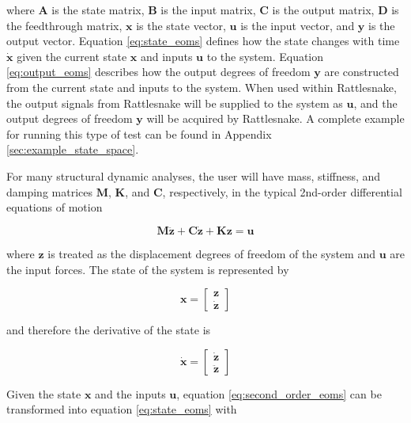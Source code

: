 \documentclass[pdf,12pt,report]{SANDreport}
\begin{document}
    where $\mathbf{A}$ is the state matrix, $\mathbf{B}$ is the input matrix, $\mathbf{C}$ is the output matrix, $\mathbf{D}$ is the feedthrough matrix, $\mathbf{x}$ is the state vector, $\mathbf{u}$ is the input vector, and $\mathbf{y}$ is the output vector.  Equation \eqref{eq:state_eoms} defines how the state changes with time $\dot{\mathbf{x}}$ given the current state $\mathbf{x}$ and inputs $\mathbf{u}$ to the system.  Equation \eqref{eq:output_eoms} describes how the output degrees of freedom $\mathbf{y}$ are constructed from the current state and inputs to the system.  When used within Rattlesnake, the output signals from Rattlesnake will be supplied to the system as $\mathbf{u}$, and the output degrees of freedom $\mathbf{y}$ will be acquired by Rattlesnake.  A complete example for running this type of test can be found in Appendix \ref{sec:example_state_space}.
    
    For many structural dynamic analyses, the user will have mass, stiffness, and damping matrices $\mathbf{M}$, $\mathbf{K}$, and $\mathbf{C}$, respectively, in the typical 2nd-order differential equations of motion
    
    \begin{equation}\label{eq:second_order_eoms}
    \mathbf{M}\ddot{\mathbf{z}} + \mathbf{C}\dot{\mathbf{z}} + \mathbf{K}\mathbf{z} = \mathbf{u}
    \end{equation}
    
    where $\mathbf{z}$ is treated as the displacement degrees of freedom of the system and $\mathbf{u}$ are the input forces.  The state of the system is represented by 
    
    \begin{equation}
        \mathbf{x} = \begin{bmatrix}
        \mathbf{z} \\
        \dot{\mathbf{z}}
        \end{bmatrix}
    \end{equation}
    
    and therefore the derivative of the state is 
    
    \begin{equation}
        \dot{\mathbf{x}} = \begin{bmatrix}
        \dot{\mathbf{z}} \\
        \ddot{\mathbf{z}}
        \end{bmatrix}
    \end{equation}
    
    Given the state $\mathbf{x}$ and the inputs $\mathbf{u}$, equation \eqref{eq:second_order_eoms} can be transformed into equation \eqref{eq:state_eoms} with
    
\end{document}
